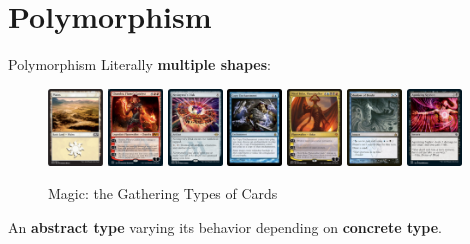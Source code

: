 \documentclass[11pt]{beamer}
\renewcommand{\emph}[1]{\textbf{#1}}
\begin{document}
\section{Polymorphism}
\begin{frame}{Polymorphism}
 Literally \emph{multiple shapes}:
 \begin{figure}
  \includegraphics[width=0.13\textwidth]{assets/figure-magic-land}
  \includegraphics[width=0.13\textwidth]{assets/figure-magic-creature}
  \includegraphics[width=0.13\textwidth]{assets/figure-magic-artifact}
  \includegraphics[width=0.13\textwidth]{assets/figure-magic-enchantment}
  \includegraphics[width=0.13\textwidth]{assets/figure-magic-planeswalker}
  \includegraphics[width=0.13\textwidth]{assets/figure-magic-instant}
  \includegraphics[width=0.13\textwidth]{assets/figure-magic-sorcery}
  \caption{Magic: the Gathering Types of Cards}
 \end{figure}
 An \emph{abstract type} varying its behavior depending on \emph{concrete type}.
\end{frame}
\end{document}
